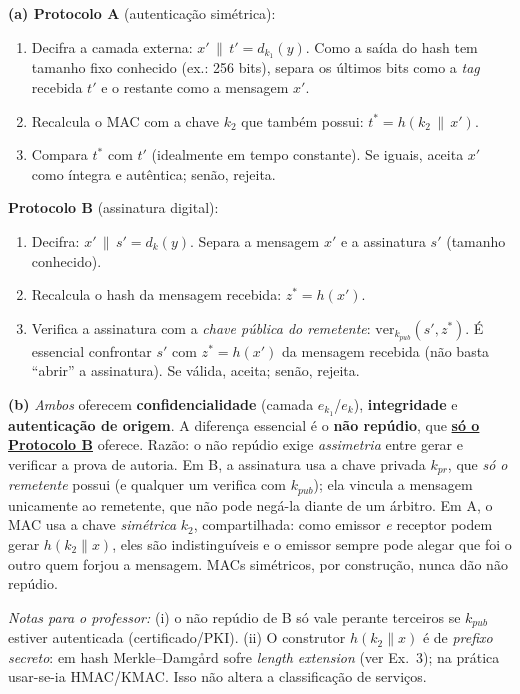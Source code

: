 \documentclass[11pt,a4paper]{article}
\newcommand{\alert}[1]{\textbf{\uline{#1}}}
\newenvironment{resposta}{%
    \begin{respostabox}
    \color{red!70!black}\sloppy
}{%
    \end{respostabox}
}
\begin{document}
\begin{resposta}
\textbf{(a) Protocolo A} (autentica\c{c}\~{a}o sim\'{e}trica):
\begin{enumerate}[label=\arabic*., topsep=1pt]
    \item Decifra a camada externa: $x' \,\|\, t' = d_{k_1}(y)$. Como a sa\'{i}da do hash tem tamanho fixo conhecido (ex.: 256 bits), separa os \'{u}ltimos bits como a \textit{tag} recebida $t'$ e o restante como a mensagem $x'$.
    \item Recalcula o MAC com a chave $k_2$ que tamb\'{e}m possui: $t^{*} = h(k_2 \,\|\, x')$.
    \item Compara $t^{*}$ com $t'$ (idealmente em tempo constante). Se iguais, aceita $x'$ como \'{i}ntegra e aut\^{e}ntica; sen\~{a}o, rejeita.
\end{enumerate}
\textbf{Protocolo B} (assinatura digital):
\begin{enumerate}[label=\arabic*., topsep=1pt]
    \item Decifra: $x' \,\|\, s' = d_{k}(y)$. Separa a mensagem $x'$ e a assinatura $s'$ (tamanho conhecido).
    \item Recalcula o hash da mensagem recebida: $z^{*} = h(x')$.
    \item Verifica a assinatura com a \emph{chave p\'{u}blica do remetente}: $\mathrm{ver}_{k_{pub}}(s', z^{*})$. \'{E} essencial confrontar $s'$ com $z^{*}=h(x')$ da mensagem recebida (n\~{a}o basta ``abrir'' a assinatura). Se v\'{a}lida, aceita; sen\~{a}o, rejeita.
\end{enumerate}

\textbf{(b)} \emph{Ambos} oferecem \textbf{confidencialidade} (camada $e_{k_1}$/$e_k$), \textbf{integridade} e \textbf{autentica\c{c}\~{a}o de origem}. A diferen\c{c}a essencial \'{e} o \textbf{n\~{a}o rep\'{u}dio}, que \alert{s\'{o} o Protocolo B} oferece. Raz\~{a}o: o n\~{a}o rep\'{u}dio exige \emph{assimetria} entre gerar e verificar a prova de autoria. Em B, a assinatura usa a chave privada $k_{pr}$, que \emph{s\'{o} o remetente} possui (e qualquer um verifica com $k_{pub}$); ela vincula a mensagem unicamente ao remetente, que n\~{a}o pode neg\'{a}-la diante de um \'{a}rbitro. Em A, o MAC usa a chave \emph{sim\'{e}trica} $k_2$, compartilhada: como emissor \emph{e} receptor podem gerar $h(k_2\|x)$, eles s\~{a}o indistingu\'{i}veis e o emissor sempre pode alegar que foi o outro quem forjou a mensagem. MACs sim\'{e}tricos, por constru\c{c}\~{a}o, nunca d\~{a}o n\~{a}o rep\'{u}dio.

{\footnotesize\textit{Notas para o professor:} (i) o n\~{a}o rep\'{u}dio de B s\'{o} vale perante terceiros se $k_{pub}$ estiver autenticada (certificado/PKI). (ii) O construtor $h(k_2\|x)$ \'{e} de \emph{prefixo secreto}: em hash Merkle--Damg\r{a}rd sofre \textit{length extension} (ver Ex.~3); na pr\'{a}tica usar-se-ia HMAC/KMAC. Isso n\~{a}o altera a classifica\c{c}\~{a}o de servi\c{c}os.}
\end{resposta}
\end{document}
